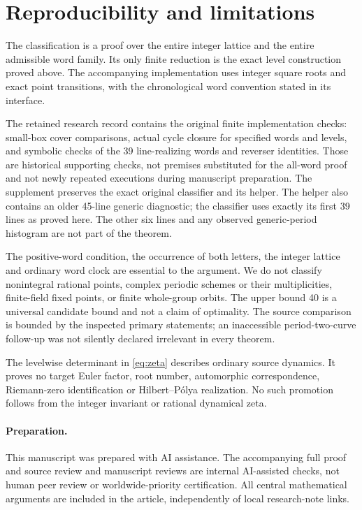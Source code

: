\section{Reproducibility and limitations}\label{sec:scope}

The classification is a proof over the entire integer
lattice and the entire admissible word family. Its only
finite reduction is the exact level construction proved
above. The accompanying implementation uses integer square
roots and exact point transitions, with the chronological
word convention stated in its interface.

The retained research record contains the original finite
implementation checks: small-box cover comparisons, actual
cycle closure for specified words and levels, and symbolic
checks of the 39 line-realizing words and reverser identities.
Those are historical supporting checks, not premises
substituted for the all-word proof and not newly repeated
executions during manuscript preparation. The supplement
preserves the exact original classifier and its helper.
The helper also contains an older 45-line generic diagnostic;
the classifier uses exactly its first 39 lines as proved
here. The other six lines and any observed generic-period
histogram are not part of the theorem.

The positive-word condition, the occurrence of both letters,
the integer lattice and ordinary word clock are essential
to the argument. We do not classify nonintegral rational
points, complex periodic schemes or their multiplicities,
finite-field fixed points, or finite whole-group orbits.
The upper bound 40 is a universal candidate bound and not
a claim of optimality. The source comparison is bounded
by the inspected primary statements; an inaccessible
period-two-curve follow-up was not silently declared
irrelevant in every theorem.

The levelwise determinant in \eqref{eq:zeta} describes
ordinary source dynamics. It proves no target Euler
factor, root number, automorphic correspondence,
Riemann-zero identification or Hilbert--P\'olya
realization. No such promotion follows from the
integer invariant or rational dynamical zeta.

\paragraph{Preparation.}
This manuscript was prepared with AI assistance. The
accompanying full proof and source review and manuscript
reviews are internal AI-assisted checks, not human
peer review or worldwide-priority certification.
All central mathematical arguments are included in
the article, independently of local research-note links.
